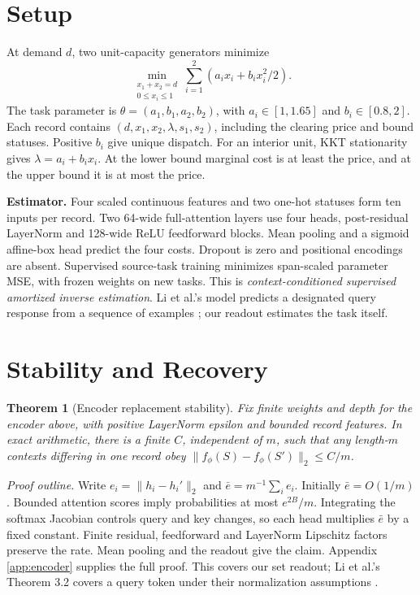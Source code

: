 \documentclass{article}
\newtheorem{theorem}{Theorem}
\newcommand{\norm}[1]{\lVert #1\rVert_2}
\newcommand{\tf}{f_\phi}
\begin{document}
\section{Setup}
At demand \(d\), two unit-capacity generators minimize
\begin{equation}
\min_{\substack{x_1+x_2=d\\0\le x_i\le1}}
\sum_{i=1}^2(a_ix_i+b_ix_i^2/2).
\label{eq:dispatch}
\end{equation}
The task parameter is \(\theta=(a_1,b_1,a_2,b_2)\), with
\(a_i\in[1,1.65]\) and \(b_i\in[0.8,2]\). Each record contains
\((d,x_1,x_2,\lambda,s_1,s_2)\), including the clearing price and
bound statuses. Positive \(b_i\) give unique dispatch. For an interior
unit, KKT stationarity gives \(\lambda=a_i+b_ix_i\). At the lower
bound marginal cost is at least the price, and at the upper bound it
is at most the price.

\textbf{Estimator.} Four scaled continuous features and two one-hot
statuses form ten inputs per record. Two 64-wide full-attention
layers use four heads, post-residual LayerNorm and 128-wide ReLU
feedforward blocks. Mean pooling and a sigmoid affine-box head
predict the four costs. Dropout is zero and positional encodings
are absent. Supervised source-task training minimizes span-scaled
parameter MSE, with frozen weights on new tasks. This is
\emph{context-conditioned supervised amortized inverse estimation}.
Li et al.'s model predicts a designated query response from a
sequence of examples \citep{li}; our readout estimates the task itself.

\section{Stability and Recovery}
\begin{theorem}[Encoder replacement stability]
\label{thm:upper}
Fix finite weights and depth for the encoder above, with positive
LayerNorm epsilon and bounded record features. In exact arithmetic,
there is a finite \(C\), independent of \(m\), such that any
length-\(m\) contexts differing in one record obey
\(\norm{\tf(S)-\tf(S')}\le C/m\).
\end{theorem}
\textit{Proof outline.} Write \(e_i=\norm{h_i-h_i'}\) and
\(\bar e=m^{-1}\sum_i e_i\). Initially \(\bar e=O(1/m)\).
Bounded attention scores imply probabilities at most \(e^{2B}/m\).
Integrating the softmax Jacobian controls query and key changes,
so each head multiplies \(\bar e\) by a fixed constant. Finite
residual, feedforward and LayerNorm Lipschitz factors preserve the
rate. Mean pooling and the readout give the claim. Appendix
\ref{app:encoder} supplies the full proof. This covers our set readout;
Li et al.'s Theorem 3.2 covers a query token under their normalization
assumptions \citep{li}.
\end{document}
